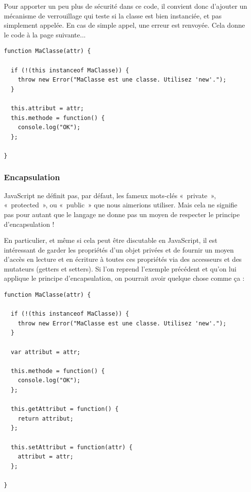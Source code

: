 \documentclass[a4paper,12pt]{article}
\begin{document}
Pour apporter un peu plus de sécurité dans ce code, il convient donc d'ajouter un mécanisme de verrouillage qui teste si la classe est bien instanciée, et pas simplement appelée. En cas de simple appel, une erreur est renvoyée. Cela donne le code à la page suivante...

\vspace{7pt}

\begin{lstlisting}
function MaClasse(attr) {

  if (!(this instanceof MaClasse)) {
    throw new Error("MaClasse est une classe. Utilisez 'new'.");
  }
  
  this.attribut = attr;
  this.methode = function() {
    console.log("OK");
  };
  
}
\end{lstlisting}

\subsubsection{Encapsulation}

JavaScript ne définit pas, par défaut, les fameux mots-clés «~private~», «~protected~», ou «~public~» que nous aimerions utiliser. Mais cela ne signifie pas pour autant que le langage ne donne pas un moyen de respecter le principe d'encapsulation !

En particulier, et même si cela peut être discutable en JavaScript, il est intéressant de garder les propriétés d'un objet privées et de fournir un moyen d'accès en lecture et en écriture à toutes ces propriétés via des accesseurs et des mutateurs (getters et setters). Si l'on reprend l'exemple précédent et qu'on lui applique le principe d'encapsulation, on pourrait avoir quelque chose comme ça :

\vspace{7pt}

\begin{lstlisting}
function MaClasse(attr) {

  if (!(this instanceof MaClasse)) {
    throw new Error("MaClasse est une classe. Utilisez 'new'.");
  }

  var attribut = attr;
  
  this.methode = function() {
    console.log("OK");
  };
  
  this.getAttribut = function() {
    return attribut;
  };
  
  this.setAttribut = function(attr) {
    attribut = attr;
  };
  
}
\end{lstlisting}
\end{document}
